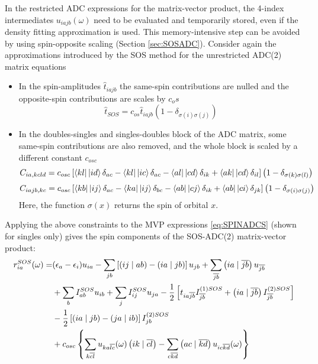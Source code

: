 In the restricted ADC expressions for the matrix-vector product, the 4-index intermediates $u_{iajb}(\omega)$ need to be evaluated and temporarily stored, even if the density fitting approximation is used. This memory-intensive step can be avoided by using spin-opposite scaling (Section \ref{sec:SOSADC}). Consider again the approximations introduced by the SOS method for the unrestricted ADC(2) matrix equations
\begin{itemize}
\item In the spin-amplitudes $\hat{t}_{iajb}$ the same-spin contributions are nulled and the opposite-spin contributions are scales by $c_os$
\begin{equation}
\hat{t}_{SOS} = c_{os} \hat{t}_{iajb} \left( 1 - \delta_{\sigma (i) \sigma (j)} \right)
\end{equation}
\item In the doubles-singles and singles-doubles block of the ADC matrix, some same-spin contributions are also removed, and the whole block is scaled by a different constant $c_{osc}$ 
\begin{equation}
C_{ia,kcld} = c_{osc} \left[ \bra{kl} {} \ket{id} \delta_{ac} - \bra{kl} {} \ket{ic} \delta_{ac} - \bra{al} {} \ket{cd} \delta_{ik} + \bra{ak} {} \ket{cd}\delta_{il} \right] \left( 1 - \delta_{\sigma (k) \sigma (l)} \right)
\end{equation}
\begin{equation}
C_{iajb,kc} = c_{osc} \left[ \bra{kb} {} \ket{ij} \delta_{ac} - \bra{ka} {} \ket{ij} \delta_{bc} - \bra{ab} {} \ket{cj} \delta_{ik} + \bra{ab} {} \ket{ci}\delta_{jk} \right] \left( 1 - \delta_{\sigma (i) \sigma (j)} \right)
\end{equation}
\noindent Here, the function $\sigma(x)$ returns the spin of orbital $x$.
\end{itemize}
Applying the above constraints to the MVP expressions \ref{eq:SPINADCS} (shown for singles only) gives the spin components of the SOS-ADC(2) matrix-vector product:
\begin{equation}
\begin{split}
r_{ia}^{SOS}( \omega) = &(\epsilon_a - \epsilon_i) u_{ia} - \sum_{jb} \left[ \left( ij \mid ab \right) - \left( ia \mid jb \right) \right] u_{jb} + \sum_{\overline{jb}} \left( ia \mid \overline{jb} \right) u_{\overline{jb}} \\
&+ \sum_b I^{SOS}_{ab} u_{ib} + \sum_{j} I^{SOS}_{ij} u_{ja} - \frac{1}{2} \left[ t_{ia\overline{jb}} I^{(1)SOS}_{\overline{jb}} + \left( ia \mid \overline{jb} \right) I_{\overline{jb}}^{(2)SOS} \right] \\
&- \frac{1}{2} \left[\left( ia \mid jb \right) - \left( ja \mid ib \right) \right] I_{jb}^{(2)SOS} \\
&+ c_{osc} \left\lbrace \sum_{k\overline{cl}} u_{ka\overline{lc}}(\omega) \left( ik \mid \overline{cl} \right) - \sum_{c\overline{kd}} \left( ac \mid \overline{kd} \right) u_{ic\overline{kd}}(\omega) \right\rbrace
\end{split}
\label{SPINSOSADC2S}
\end{equation}  
